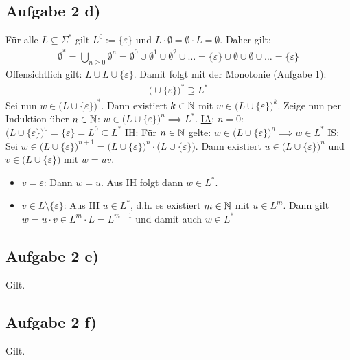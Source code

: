 \documentclass[12pt,a4paper]{article}
\begin{document}
\subsection*{Aufgabe 2 d)}
Für alle $L\subseteq\Sigma^\ast$ gilt $L^0:=\lbrace\varepsilon\rbrace$ und $L\cdot\emptyset=\emptyset\cdot L=\emptyset$. Daher gilt:
\begin{align*}
\emptyset^\ast=\bigcup\limits_{n\geq0}\emptyset^n=\emptyset^0\cup\emptyset^1\cup\emptyset^2\cup\ldots=\lbrace\varepsilon\rbrace\cup\emptyset\cup\emptyset\cup\ldots=\lbrace\varepsilon\rbrace
\end{align*}
Offensichtlich gilt: $L\cup L\cup\lbrace\varepsilon\rbrace$. Damit folgt mit der Monotonie (Aufgabe 1):
\begin{align*}
\big(\cup\lbrace\varepsilon\rbrace\big)^\ast\supseteq L^\ast
\end{align*}
Sei nun $w\in \big(L\cup\lbrace\varepsilon\rbrace\big)^\ast$. Dann existiert $k\in\mathbb{N}$ mit $w\in\big(L\cup\lbrace\varepsilon\rbrace\big)^k$. Zeige nun per Induktion über $n\in\mathbb{N}$: $w\in\big(L\cup\lbrace\varepsilon\rbrace\big)^n\implies L^\ast$.\nl
\ul{IA}: $n=0$: $\big(L\cup\lbrace\varepsilon\rbrace\big)^0=\lbrace\varepsilon\rbrace=L^0\subseteq L^\ast$\nl
\ul{IH:} Für $n\in\mathbb{N}$ gelte: $w\in\big(L\cup\lbrace\varepsilon\rbrace\big)^n\implies w\in L^\ast$\nl
\ul{IS:} Sei $w\in\big(L\cup\lbrace\varepsilon\rbrace\big)^{n+1}=\big(L\cup\lbrace\varepsilon\rbrace\big)^n\cdot\big(L\cup\lbrace\varepsilon\rbrace\big)$. Dann existiert $u\in\big(L\cup\lbrace\varepsilon\rbrace\big)^n$ und $v\in\big(L\cup\lbrace\varepsilon\rbrace\big)$ mit $w=uv$.\\
\begin{itemize}
\item $v=\varepsilon$: Dann $w=u$. Aus IH folgt dann $w\in L^\ast$.
\item $v\in L\setminus\lbrace\varepsilon\rbrace$: Aus IH $u\in L^\ast$, d.h. es existiert $m\in\mathbb{N}$ mit $u\in L^m$. Dann gilt $w=u\cdot v\in L^m\cdot L=L^{m+1}$ und damit auch $w\in L^\ast$
\end{itemize}

\subsection*{Aufgabe 2 e)}
Gilt.

\subsection*{Aufgabe 2 f)}
Gilt.
\end{document}
